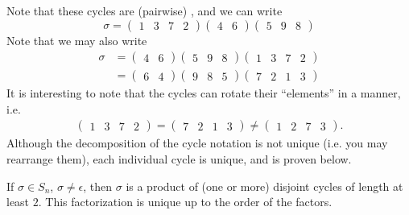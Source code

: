 \documentclass[notoc,notitlepage]{tufte-book}
\begin{document}
Note that these cycles are (pairwise) , and we can write
\begin{equation*}
  \sigma = \begin{pmatrix} 1 & 3 & 7 & 2 \end{pmatrix}\begin{pmatrix} 4 & 6 \end{pmatrix}\begin{pmatrix} 5 & 9 & 8 \end{pmatrix}
\end{equation*}
Note that we may also write
\begin{align*}
  \sigma &= \begin{pmatrix} 4 & 6 \end{pmatrix}\begin{pmatrix} 5 & 9 & 8 \end{pmatrix}\begin{pmatrix} 1 & 3 & 7 & 2 \end{pmatrix} \\
    &= \begin{pmatrix} 6 & 4 \end{pmatrix}\begin{pmatrix} 9 & 8 & 5 \end{pmatrix}\begin{pmatrix} 7 & 2 & 1 & 3 \end{pmatrix}
\end{align*}
It is interesting to note that the cycles can rotate their ``elements'' in a  manner, i.e.
\begin{gather*}
  \begin{pmatrix} 1 & 3 & 7 & 2 \end{pmatrix} = \begin{pmatrix} 7 & 2 & 1 & 3 \end{pmatrix} \neq \begin{pmatrix} 1 & 2 & 7 & 3 \end{pmatrix}.
\end{gather*}
Although the decomposition of the cycle notation is not unique (i.e. you may rearrange them), each individual cycle is unique, and is proven below.

\begin{thm}\label{thm:cycle_decomposition_theorem}
  If $\sigma \in S_n$, $\sigma \neq \epsilon$, then $\sigma$ is a product of (one or more) disjoint cycles of length at least $2$. This factorization is unique up to the order of the factors.
\end{thm}
\end{document}

